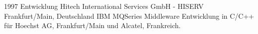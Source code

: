 \cventry
{1997}
{Entwicklung}
{}
{Hitech International Services GmbH - HISERV}
{Frankfurt/Main, Deutschland}
{
  IBM MQSeries Middleware Entwicklung in C/C++ für Hoechst AG, Frankfurt/Main und Alcatel, Frankreich.
}
